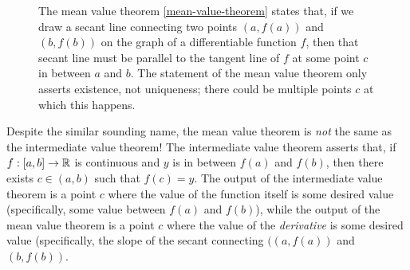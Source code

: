 \begin{figure}
	\begin{center}
	\end{center}

	\caption{The mean value theorem \ref{mean-value-theorem} states that, if we draw a secant line connecting two points $(a,f(a))$ and $(b,f(b))$ on the graph of a differentiable function $f$, then that secant line must be parallel to the tangent line of $f$ at some point $c$ in between $a$ and $b$. The statement of the mean value theorem only asserts existence, not uniqueness; there could be multiple points $c$ at which this happens.} \label{mean-value-theorem-picture} 
\end{figure}

\begin{caution}
	Despite the similar sounding name, the mean value theorem is \emph{not} the same as the intermediate value theorem! The intermediate value theorem asserts that, if $f : [a,b] \to \mathbb{R}$ is continuous and $y$ is in between $f(a)$ and $f(b)$, then there exists $c \in (a,b)$ such that $f(c) = y$. The output of the intermediate value theorem is a point $c$ where the value of the function itself is some desired value (specifically, some value between $f(a)$ and $f(b)$), while the output of the mean value theorem is a point $c$ where the value of the \emph{derivative} is some desired value (specifically, the slope of the secant connecting $((a,f(a))$ and $(b,f(b))$. 
\end{caution}

